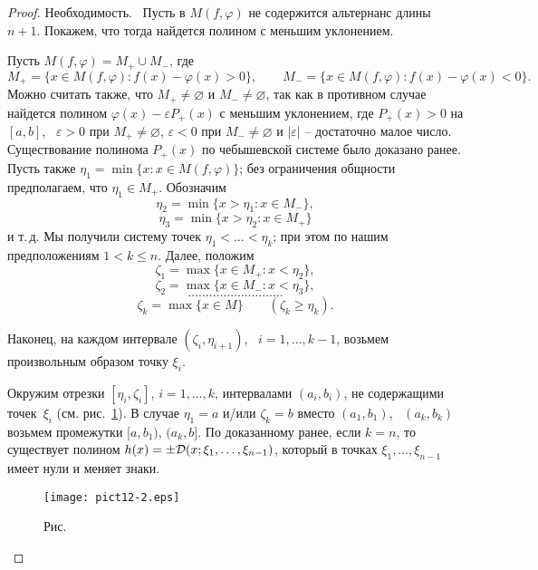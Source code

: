 \begin{proof}
Н\;е\;о\;б\;х\;о\;д\;и\;м\;о\;с\;т\;ь.~ Пусть в $M(f,\varphi)$ не
содержится альтернанс длины $n+1$. Покажем, что тогда найдется полином с
меньшим уклонением.

Пусть $M(f,\varphi) = M_+\cup M_-$, где
$$
M_+=\{x\in M(f,\varphi)\colon f(x)-\varphi(x)>0\},\qquad
M_-=\{x\in M(f,\varphi)\colon f(x)-\varphi(x)<0\}.
$$
{Можно считать также,
что $M_+\ne \varnothing$ и $M_-\ne \varnothing$, так как в противном случае найдется}
{полином $\varphi(x)-\varepsilon P_+(x)$ с меньшим уклонением, где
$P_+(x)>0$ на $[a,b]$,~ $\varepsilon>0$ при} {$M_+\ne \varnothing$,
$\varepsilon<0$ при $M_-\ne \varnothing$ и $|\varepsilon|$ -- достаточно
малое число. Существование полинома} {$P_+(x)$ по чебышевской системе было
доказано ранее.} Пусть также $\eta_1=\min\{x\colon x\in M(f,\varphi)\}$;
без ограничения общности предполагаем, что $\eta_1\in M_+$. Обозначим
$$ \eta_2 = \min\{x>\eta_1\colon x\in M_-\}, $$
$$ \eta_3 = \min\{x>\eta_2\colon x\in M_+\} $$
и т.\,д. Мы получили систему точек $\eta_1<\ldots<\eta_k$; при этом по
{нашим предположениям} {$1<k\le n$}. Далее, положим
$$ \zeta_1 = \max\{x\in M_+\colon x<\eta_2\}, $$
$$ \zeta_2 = \max\{x\in M_-\colon x<\eta_3\}, $$
$$ {\ldots\ldots\ldots\ldots\ldots\ldots\ldots\ldots\ldots} $$
$$ {\zeta_k = \max\{x\in M\} \qquad (\zeta_k\ge\eta_k).} $$


Наконец, на каждом интервале $(\zeta_i,\eta_{i+1})$,~ $i=1,\ldots,k-1$,
возьмем произвольным образом точку $\xi_i$.

Окружим отрезки $[\eta_i,\zeta_i]$, {$i=1,\ldots,k$}, интервалами {$(a_i,b_i)$},
не содержащими точек~$\xi_i$ (см. рис.~\ref{r12-2}). В случае $\eta_1=a$
и/или $\zeta_k=b$ вместо $(a_1,b_1)$,~ $(a_k,b_k)$ возьмем промежутки $[a,b_1)$,
$(a_k,b]$. По доказанному ранее, если $k=n$, то существует
полином $h(x)=\pm{\cal D}(x;\xi_1,\ldots,\xi_{n-1})$,
который в точках $\xi_1,\ldots,\xi_{n-1}$ имеет нули и меняет знаки.

 \bigskip
\begin{figure}[ht]
\begin{center}
\texttt{[image: pict12-2.eps]}
\end{center}
 \bigskip
 \label{r12-2}

 \centerline{Рис.~\theris}
 \bigskip
\end{figure}



\end{proof}
